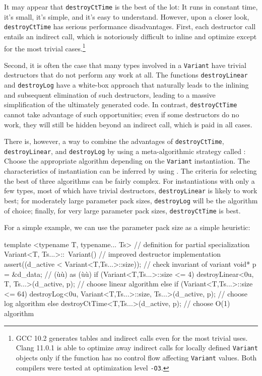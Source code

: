 It may appear that \lstinline!destroyCtTime! is the best of the lot: It
runs in constant time, it's small, it's simple, and it's easy to
understand. However, upon a closer look, \lstinline!destroyCtTime! has
serious performance disadvantages. First, each destructor call entails
an indirect call, which is notoriously difficult to inline and optimize
except for the most trivial cases.{\cprotect\footnote{GCC 10.2 generates
tables and indirect calls even for the most trivial uses. Clang 11.0.1
is able to optimize away indirect calls for locally defined
\lstinline!Variant! objects only if the function has no control flow
affecting \lstinline!Variant! values. Both compilers were tested at
  optimization level \lstinline!-O3!.}}

Second, it is often the case that many types involved in a
\lstinline!Variant! have trivial destructors that do not perform any work
at all. The functions \lstinline!destroyLinear! and \lstinline!destroyLog!
have a white-box approach that naturally leads to the inlining and
subsequent elimination of such destructors, leading to a massive
simplification of the ultimately generated code. In contrast,
\lstinline!destroyCtTime! cannot take advantage of such opportunities; even
if some destructors do no work, they will still be hidden beyond an
indirect call, which is paid in all cases.

There is, however, a way to combine the advantages of
\lstinline!destroyCtTime!, \lstinline!destroyLinear!, and \lstinline!destroyLog!
by using a meta-algorithmic strategy called : Choose the appropriate algorithm depending on the
\lstinline!Variant! instantiation. The characteristics of instantiation can
be inferred by using . The criteria
for selecting the best of three algorithms can be fairly complex. For
instantiations with only a few types, most of which have trivial
destructors, \lstinline!destroyLinear! is likely to work best; for
moderately large parameter pack sizes, \lstinline!destroyLog! will be the
algorithm of choice; finally, for very large parameter pack sizes,
\lstinline!destroyCtTime! is best.

For a simple example, we can use the parameter pack size as a simple
heuristic:

\begin{emcppslisting}[emcppsbatch=e39]
template <typename T, typename... Ts>  // definition for partial specialization
Variant<T, Ts...>::~Variant()          // improved destructor implementation
{
    assert((d_active < Variant<T,Ts...>::size));   // check invariant of variant
    void* p = &d_data;                             // (ù{}ù) as (ù{}ù)
    if (Variant<T,Ts...>::size <= 4)
        destroyLinear<0u, T, Ts...>(d_active, p);  // choose linear algorithm
    else if (Variant<T,Ts...>::size <= 64)
        destroyLog<0u, Variant<T,Ts...>::size,
                   Ts...>(d_active, p);            // choose log algorithm
    else
        destroyCtTime<T,Ts...>(d_active, p);       // choose O(1) algorithm
}
\end{emcppslisting}
    

